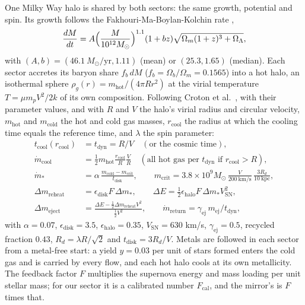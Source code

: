 \documentclass[11pt]{article}
\theoremstyle{definition}
\newcommand{\Msun}{M_{\odot}}
\newcommand{\kpc}{\mathrm{kpc}}
\begin{document}
One Milky Way halo is shared by both sectors: the same growth, potential and spin. Its growth follows the Fakhouri-Ma-Boylan-Kolchin rate \cite{Fakhouri2010},
\[
\frac{dM}{dt} = A\Bigl(\frac{M}{10^{12}\Msun}\Bigr)^{1.1}(1 + bz)\sqrt{\Omega_{m}(1+z)^{3} + \Omega_{\Lambda}},
\]
with $(A, b) = (46.1\ \Msun/\mathrm{yr}, 1.11)$ (mean) or $(25.3, 1.65)$ (median). Each sector accretes its baryon share $f_{b}\,dM$ ($f_{b} = \Omega_{b}/\Omega_{m} = 0.1565$) into a hot halo, an isothermal sphere $\rho_{g}(r) = m_{\mathrm{hot}}/(4\pi Rr^{2})$ at the virial temperature $T = \mu m_{p}V^{2}/2k$ of its own composition. Following Croton et al.\ \cite{Croton2006}, with their parameter values, and with $R$ and $V$ the halo's virial radius and circular velocity, $m_{\mathrm{hot}}$ and $m_{\mathrm{cold}}$ the hot and cold gas masses, $r_{\mathrm{cool}}$ the radius at which the cooling time equals the reference time, and $\lambda$ the spin parameter:
\begin{align*}
t_{\mathrm{cool}}(r_{\mathrm{cool}}) &= t_{\mathrm{dyn}} = R/V \quad (\text{or the cosmic time}),\\
\dot m_{\mathrm{cool}} &= \tfrac{1}{2}m_{\mathrm{hot}}\frac{r_{\mathrm{cool}}}{R}\frac{V}{R} \quad (\text{all hot gas per } t_{\mathrm{dyn}} \text{ if } r_{\mathrm{cool}} > R),\\
\dot m_{*} &= \alpha\,\frac{m_{\mathrm{cold}} - m_{\mathrm{crit}}}{t_{\mathrm{disk}}}, \qquad
m_{\mathrm{crit}} = 3.8 \times 10^{9}\Msun\,\frac{V}{200\ \mathrm{km/s}}\,\frac{3R_{d}}{10\ \kpc},\\
\Delta m_{\mathrm{reheat}} &= \epsilon_{\mathrm{disk}}F\,\Delta m_{*}, \qquad
\Delta E = \tfrac{1}{2}\epsilon_{\mathrm{halo}}F\,\Delta m_{*}V_{\mathrm{SN}}^{2},\\
\Delta m_{\mathrm{eject}} &= \frac{\Delta E - \tfrac{1}{2}\Delta m_{\mathrm{reheat}}V^{2}}{\tfrac{1}{2}V^{2}}, \qquad
\dot m_{\mathrm{return}} = \gamma_{\mathrm{ej}}\,m_{\mathrm{ej}}/t_{\mathrm{dyn}},
\end{align*}
with $\alpha = 0.07$, $\epsilon_{\mathrm{disk}} = 3.5$, $\epsilon_{\mathrm{halo}} = 0.35$, $V_{\mathrm{SN}} = 630$ km/s, $\gamma_{\mathrm{ej}} = 0.5$, recycled fraction $0.43$, $R_{d} = \lambda R/\sqrt{2}$ and $t_{\mathrm{disk}} = 3R_{d}/V$. Metals are followed in each sector from a metal-free start: a yield $y = 0.03$ per unit of stars formed enters the cold gas and is carried by every flow, and each hot halo cools at its own metallicity. The feedback factor $F$ multiplies the supernova energy and mass loading per unit stellar mass; for our sector it is a calibrated number $F_{\mathrm{cal}}$, and the mirror's is $F$ times that.
\end{document}
